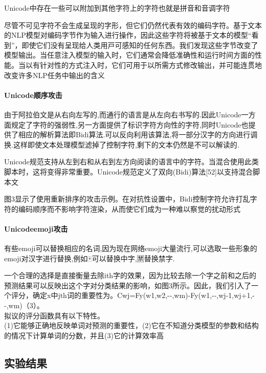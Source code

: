 \documentclass[
]{article}
\begin{document}
Unicode中存在一些可以附加到其他字符上的字符也就是拼音和音调字符

尽管不可见字符不会生成呈现的字形，但它们仍然代表有效的编码字符。基于文本的NLP模型对编码字节作为输⼊进行操作，因此这些字符将被基于文本的模型``看到''，即使它们没有呈现给⼈类用⼾可感知的任何东西。我们发现这些字节改变了模型输出。当任意注⼊模型的输⼊时，它们通常会降低准确性和运行时间方⾯的性能。当以有针对性的方式注⼊时，它们可用于以所需方式修改输出，并可能连贯地改变许多NLP任务中输出的含义

\hypertarget{unicodeux987aux5e8fux653bux51fb}{%
\paragraph{Unicode顺序攻击}\label{unicodeux987aux5e8fux653bux51fb}}

由于阿拉伯文是从右向左写的,而通行的语言是从左向右书写的.因此Unicode一方面规定了字符的强弱性,另一方面提供了标识字符方向性的字符,同时Unicode也提供了相应的解析算法即Bidi算法.可以反向利用该算法,将一部分汉字的方向进行调换.这样即使文本处理模型滤掉了控制字符,剩下的文本仍然是不可以解读的.

Unicode规范⽀持从左到右和从右到左方向阅读的语⾔中的字符。当混合使用此类脚本时，这将变得⾮常重要。Unicode规范定义了双向(Bidi)算法{[}52{]}以⽀持混合脚本文

图3显示了使用重新排序的攻击示例。在对抗性设置中，Bidi控制字符允许打乱字符的编码顺序⽽不影响字符渲染，从⽽使它们成为⼀种难以察觉的扰动形式

\hypertarget{unicodeemojiux653bux51fb}{%
\paragraph{Unicodeemoji攻击}\label{unicodeemojiux653bux51fb}}

有些emoji可以替换相应的名词,因为现在网络emoji大量流行,可以选取一些形象的emoji对汉字进行替换,例如🀄可以替换中字,🈲替换禁字.

一个合理的选择是直接衡量去除ith字的效果，因为比较去除一个字之前和之后的预测结果可以反映出这个字对分类结果的影响，如图3所示。因此，我们引入了一个评分，确定x中jth词的重要性为。Cwj=Fy(w1,w2,-\/-,wm)-Fy(w1,-\/-,wj-1,wj+1,-\/-,wm)（3）。\\
拟议的评分函数具有以下特性。\\
(1)它能够正确地反映单词对预测的重要性，(2)它在不知道分类模型的参数和结构的情况下计算单词的分数，并且(3)它的计算效率高

\hypertarget{ux5b9eux9a8cux7ed3ux679c}{%
\subsection{实验结果}\label{ux5b9eux9a8cux7ed3ux679c}}
\end{document}
